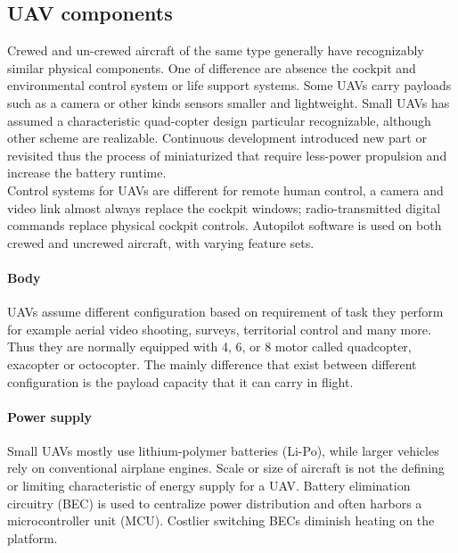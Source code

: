 \subsection{UAV components}
\label{ssec:components}
%
Crewed and un-crewed aircraft of the same type generally have recognizably
similar physical components.  One of difference are absence the cockpit and
environmental control system or life support systems.  
Some UAVs carry payloads such as a camera or other kinds sensors smaller and 
lightweight.
Small UAVs has assumed a characteristic quad-copter design particular
recognizable, although other scheme are realizable. 
Continuous development introduced new part or revisited thus the process of
miniaturized that require less-power propulsion and increase the battery
runtime.\\
Control systems for UAVs are different for remote human control, a camera
and video link almost always replace the cockpit windows; radio-transmitted
digital commands replace physical cockpit controls. Autopilot software is used
on both crewed and uncrewed aircraft, with varying feature sets.\cite{wiki:uav}
%
%
\begin{figure}[htb]
    \centering
     \quad
    \label{fig:uav-design}
\end{figure}
%
%
\paragraph{Body} UAVs assume different configuration based on requirement of
task they perform for example aerial video shooting, surveys, territorial
control and many more.
Thus they are normally equipped with 4, 6, or 8 motor called quadcopter,
exacopter or octocopter.
The mainly difference that exist between different configuration is the payload
capacity that it can carry in flight.
%
\paragraph{Power supply}
Small UAVs mostly use lithium-polymer batteries (Li-Po), while larger vehicles
rely on conventional airplane engines. Scale or size of aircraft is not the
defining or limiting characteristic of energy supply for a UAV. 
Battery elimination circuitry (BEC) is used to centralize power distribution and
often harbors a microcontroller unit (MCU). Costlier switching BECs diminish
heating on the platform.\cite{wiki:uav}
%
